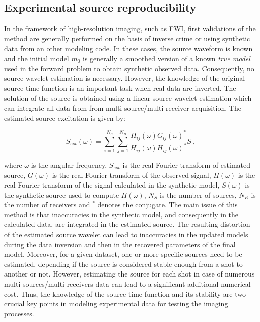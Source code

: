 \documentclass[manuscript,revised]{geophysics}
\begin{document}
\subsection{Experimental source reproducibility}

\noindent In the framework of high-resolution imaging, such as FWI, first validations of the method are generally performed on the basis of inverse crime or using synthetic data from an other modeling code. In these cases, the source waveform is known and the initial model $m_{0}$ is generally a smoothed version of a known \textit{true model} used in the forward problem to obtain synthetic observed data. Consequently, no source wavelet estimation is necessary. However, the knowledge of the original source time function is an important task when real data are inverted. The solution of the source is obtained using a linear source wavelet estimation \citep{Pratt_FWI_1999,Virieux_FWI_2009} which can integrate all data from from multi-source/multi-receiver acquisition. The estimated source excitation is given by:

\begin{equation}
	S_{est}(\omega)=\sum\limits_{i=1}^{N_{S}}\sum\limits_{j=1}^{N_{R}}\frac{H_{ij}(\omega)G_{ij}(\omega)^{*}}{H_{ij}(\omega)H_{ij}(\omega)^{*}}S\ ,
	\label{eq:lswe}
\end{equation}

\noindent where $\omega$ is the angular frequency, $S_{est}$ is the real Fourier transform of estimated source, $G(\omega)$ is the real Fourier transform of the observed signal, $H(\omega)$ is the real Fourier transform of the signal calculated in the synthetic model, $S(\omega)$ is the synthetic source used to compute $H(\omega)$, $N_{S}$ is the number of sources, $N_{R}$ is the number of receivers and $^{*}$ denotes the conjugate. The main issue of this method is that inaccuracies in the synthetic model, and consequently in the calculated data, are integrated in the estimated source. %
The resulting distortion of the estimated source wavelet can lead to inaccuracies in the updated models during the data inversion and then in the recovered parameters of the final model. Moreover, for a given dataset, one or more specific sources need to be estimated, depending if the source is considered stable enough from a shot to another or not. However, estimating the source for each shot in case of numerous multi-sources/multi-receivers data can lead to a significant additional numerical cost. Thus, the knowledge of the source time function and its stability are two crucial key points in modeling experimental data for testing the imaging processes.
\end{document}
